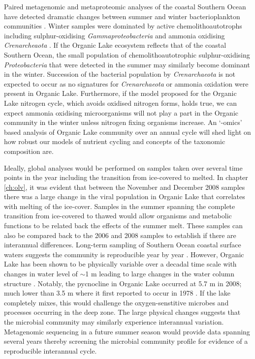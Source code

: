 Paired metagenomic and metaproteomic analyses of the coastal Southern Ocean have detected dramatic changes between summer and winter bacterioplankton communities \cite{Grzymski2012, Williams2012a}.
Winter samples were dominated by active chemolithoautotrophs including sulphur-oxidising \emph{Gammaproteobacteria} and ammonia oxidising \emph{Crenarcheaota} \cite{Grzymski2012, Williams2012b}.
If the Organic Lake ecosystem reflects that of the coastal Southern Ocean, the small population of chemolithoautotrophic sulphur-oxidising \emph{Proteobacteria} that were detected in the summer may similarly become dominant in the winter.
Succession of the bacterial population by \emph{Crenarchaeota} is not expected to occur as no signatures for \emph{Crenarchaeota} or ammonia oxidation were present in Organic Lake.
Furthermore, if the model proposed for the Organic Lake nitrogen cycle, which avoids oxidised nitrogen forms, holds true, we can expect ammonia oxidising microorganisms will not play a part in the Organic community in the winter unless nitrogen fixing organisms increase.
An `-omics' based analysis of Organic Lake community over an annual cycle will shed light on how robust our models of nutrient cycling and concepts of the taxonomic composition are.

Ideally, global analyses would be performed on samples taken over several time points in the year including the transition from ice-covered to melted.
In chapter \ref{ch:olv}, it was evident that between the November and December 2008 samples there was a large change in the viral population in Organic Lake that correlates with melting of the ice-cover.
Samples in the summer spanning the complete transition from ice-covered to thawed would allow organisms and metabolic functions to be related back the effects of the summer melt.
These samples can also be compared back to the 2006 and 2008 samples to establish if there are interannual differences.
Long-term sampling of Southern Ocean coastal surface waters suggests the community is reproducible year by year \cite{Murray2007}.
However, Organic Lake has been shown to be physically variable over a decadal time scale with changes in water level of $\sim$1 m leading to large changes in the water column structure \cite{Gibson1995, Gibson1996}.
Notably, the pycnocline in Organic Lake occurred at 5.7 m in 2008; much lower than 3.5 m where it first reported to occur in 1978 \cite{Franzmann1987b}.
If the lake completely mixes, this would challenge the oxygen-senstitive microbes and processes occurring in the deep zone.
The large physical changes suggests that the microbial community may similarly experience interannual variation.
Metagenomic sequencing in a future summer season would provide data spanning several years thereby screening the microbial community profile for evidence of a reproducible interannual cycle.

